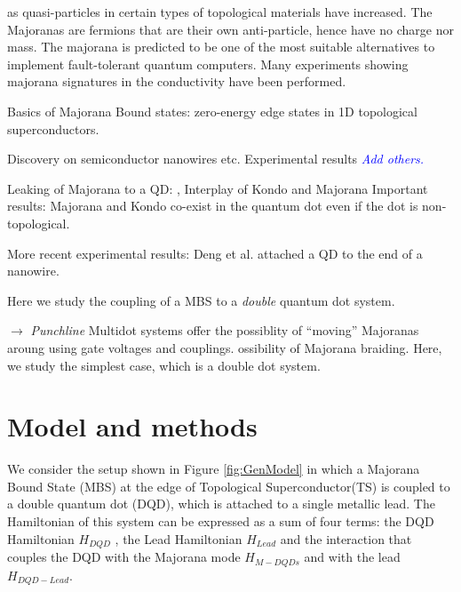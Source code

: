 \documentclass[showpacs,aps,prb,reprint,superscriptaddress]{revtex4-1}
\newcommand{\TS}[1]{{$\rightarrow$ {\sl#1}}}
\newcommand{\LUIS}[1]{\textcolor{blue}{\fbox{Luis} {\sl#1}}}
\begin{document}
as quasi-particles in certain types of topological materials have increased. The Majoranas are fermions that are their own anti-particle, hence have no charge nor mass. 
The majorana is predicted to be one of the most suitable alternatives to implement fault-tolerant quantum computers. Many experiments showing majorana signatures in the conductivity have been performed. 





Basics of Majorana Bound states:  zero-energy edge states in 1D topological superconductors.  

Discovery on semiconductor nanowires \cite{Oreg:Phys.Rev.Lett.:177002:2010,Lutchyn:Phys.Rev.Lett.:77001:2010,Alicea:Reports:2012} etc. Experimental results \cite{Mourik:Science:1003:2012} \LUIS{Add others.}


Leaking of Majorana to a QD: \cite{vernek_subtle_2014}, Interplay of Kondo and Majorana\cite{ruiz-tijerina_interaction_2015} Important results: Majorana and Kondo co-exist in the quantum dot even if the dot is non-topological.

More recent experimental results: Deng et al. \cite{deng_majorana_2016} attached a QD to the end of a nanowire.

Here we study the coupling of a MBS to a \emph{double} quantum dot system. 

\TS{Punchline} Multidot systems offer the possiblity of ``moving'' Majoranas aroung using gate voltages and couplings. ossibility of Majorana braiding. Here, we study the simplest case, which is a double dot system.

\section{Model and methods}
\label{sec:modelmethods}





We consider the setup shown in Figure \ref{fig:GenModel} in which a Majorana Bound State (MBS) at the edge of Topological Superconductor(TS) is coupled to a double quantum dot (DQD), which is attached to a single metallic lead. The Hamiltonian of this system can be expressed as a sum of four terms: the DQD Hamiltonian $H_{DQD}$ , the Lead Hamiltonian $H_{Lead}$ and the interaction that couples the DQD with the Majorana mode $H_{M-DQDs}$ and  with the lead $H_{DQD-Lead}$. 
\end{document}
